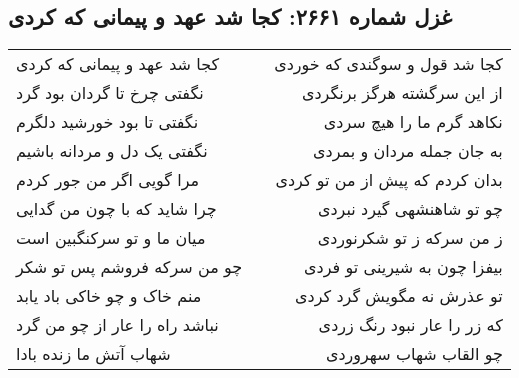 \begin{center}
\section*{غزل شماره ۲۶۶۱: کجا شد عهد و پیمانی که کردی}
\label{sec:2661}
\begin{longtable}{l p{0.5cm} r}
کجا شد عهد و پیمانی که کردی
&&
کجا شد قول و سوگندی که خوردی
\\
نگفتی چرخ تا گردان بود گرد
&&
از این سرگشته هرگز برنگردی
\\
نگفتی تا بود خورشید دلگرم
&&
نکاهد گرم ما را هیچ سردی
\\
نگفتی یک دل و مردانه باشیم
&&
به جان جمله مردان و بمردی
\\
مرا گویی اگر من جور کردم
&&
بدان کردم که پیش از من تو کردی
\\
چرا شاید که با چون من گدایی
&&
چو تو شاهنشهی گیرد نبردی
\\
میان ما و تو سرکنگبین است
&&
ز من سرکه ز تو شکرنوردی
\\
چو من سرکه فروشم پس تو شکر
&&
بیفزا چون به شیرینی تو فردی
\\
منم خاک و چو خاکی باد یابد
&&
تو عذرش نه مگویش گرد کردی
\\
نباشد راه را عار از چو من گرد
&&
که زر را عار نبود رنگ زردی
\\
شهاب آتش ما زنده بادا
&&
چو القاب شهاب سهروردی
\\
\end{longtable}
\end{center}
